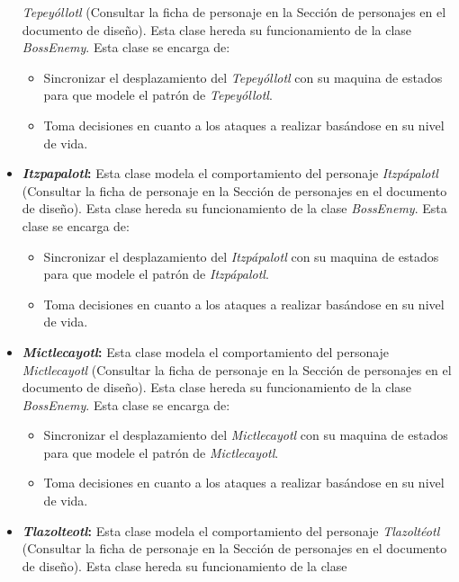\begin{itemize}
			\textit{Tepeyóllotl} (Consultar la ficha de personaje en la Sección de personajes en 
			el documento de diseño). Esta clase hereda su funcionamiento de la clase 
			\textit{BossEnemy}. Esta clase se encarga de:  
			\begin{itemize}
				\item Sincronizar el desplazamiento del \textit{Tepeyóllotl} con su maquina 
				de estados para que modele el patrón de \textit{Tepeyóllotl}.
				\item Toma decisiones en cuanto a los ataques a realizar basándose en su 
				nivel de vida.
			\end{itemize}
			\item \textbf{\textit{Itzpapalotl}:} Esta clase modela el comportamiento del personaje 
			\textit{Itzpápalotl} (Consultar la ficha de personaje en la Sección de personajes en 
			el documento de diseño). Esta clase hereda su funcionamiento de la clase 
			\textit{BossEnemy}. Esta clase se encarga de:  
			\begin{itemize}
				\item Sincronizar el desplazamiento del \textit{Itzpápalotl} con su maquina 
				de estados para que modele el patrón de \textit{Itzpápalotl}.
				\item Toma decisiones en cuanto a los ataques a realizar basándose en su 
				nivel de vida.
			\end{itemize}
			\item \textbf{\textit{Mictlecayotl}:} Esta clase modela el comportamiento del personaje 
			\textit{Mictlecayotl} (Consultar la ficha de personaje en la Sección de personajes en 
			el documento de diseño). Esta clase hereda su funcionamiento de la clase 
			\textit{BossEnemy}. Esta clase se encarga de:  
			\begin{itemize}
				\item Sincronizar el desplazamiento del \textit{Mictlecayotl} con su maquina 
				de estados para que modele el patrón de \textit{Mictlecayotl}.
				\item Toma decisiones en cuanto a los ataques a realizar basándose en su 
				nivel de vida.
			\end{itemize}
			\item \textbf{\textit{Tlazolteotl}:} Esta clase modela el comportamiento del personaje 
			\textit{Tlazoltéotl} (Consultar la ficha de personaje en la Sección de personajes en 
			el documento de diseño). Esta clase hereda su funcionamiento de la clase 

\end{itemize}
